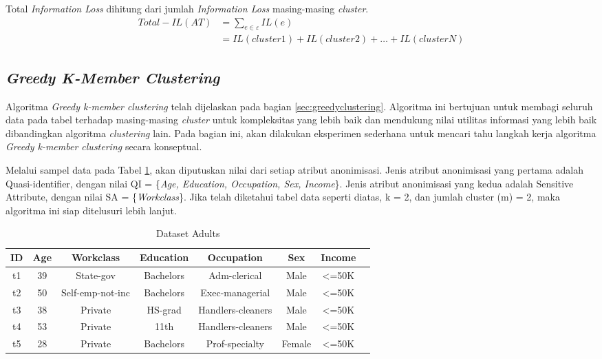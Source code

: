 \noindent Total \textit{Information Loss} dihitung dari jumlah \textit{Information Loss} masing-masing \textit{cluster}.
\begin{align*}
Total-IL(AT) &= \sum_{e \in \varepsilon}^{}  IL(e)\\
&= IL(cluster1)+IL(cluster2)+\ldots+IL(clusterN)
\end{align*}

\subsection{\textit{Greedy K-Member Clustering}}
Algoritma \textit{Greedy k-member clustering} telah dijelaskan pada bagian \ref{sec:greedyclustering}. Algoritma ini bertujuan untuk membagi seluruh data pada tabel terhadap masing-masing \textit{cluster} untuk kompleksitas yang lebih baik dan mendukung nilai utilitas informasi yang lebih baik dibandingkan algoritma \textit{clustering} lain. Pada bagian ini, akan dilakukan eksperimen sederhana untuk mencari tahu langkah kerja algoritma \textit{Greedy k-member clustering} secara konseptual.

\par Melalui sampel data pada Tabel \ref{table:adults}, akan diputuskan nilai dari setiap atribut anonimisasi. Jenis atribut anonimisasi yang pertama adalah Quasi-identifier, dengan nilai QI = \{\textit{Age, Education, Occupation, Sex, Income}\}. Jenis atribut anonimisasi yang kedua adalah Sensitive Attribute, dengan nilai SA = \{\textit{Workclass}\}. Jika telah diketahui tabel data seperti diatas, k = 2, dan jumlah cluster (m) = 2, maka algoritma ini siap ditelusuri lebih lanjut.

\begin{table}[H]
\centering
\caption{Dataset Adults}
\begin{tabular}{c c c c c c c c}
\hline 
ID & Age & Workclass & Education & Occupation & Sex & Income\\ 
\hline 
t1 & 39 & State-gov & Bachelors & Adm-clerical & Male & <=50K \\ 

t2 & 50 & Self-emp-not-inc & Bachelors & Exec-managerial & Male & <=50K  \\ 

t3 & 38 & Private & HS-grad & Handlers-cleaners & Male & <=50K  \\ 

t4 & 53 & Private & 11th & Handlers-cleaners & Male & <=50K  \\ 
 
t5 & 28 & Private & Bachelors & Prof-specialty & Female & <=50K	 \\ 
\hline 
\end{tabular} 
\label{table:adults}
\end{table}

